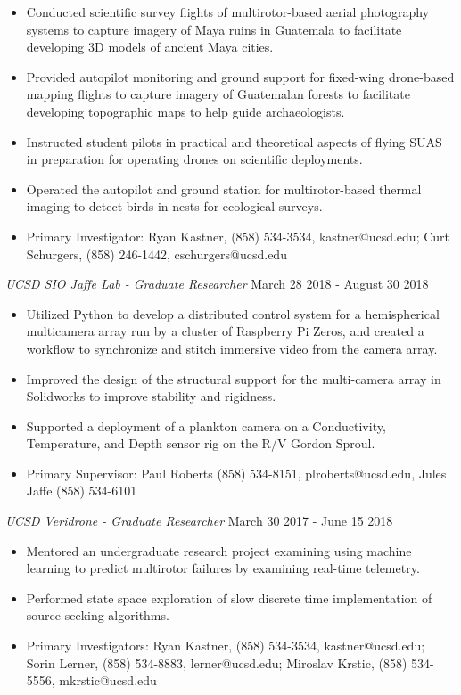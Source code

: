 \documentclass[line,margin]{res}
\begin{document}
\begin{resume}
\begin{itemize}
		\item Conducted scientific survey flights of multirotor-based aerial photography systems to capture imagery of Maya ruins in Guatemala to facilitate developing 3D models of ancient Maya cities.
		\item Provided autopilot monitoring and ground support for fixed-wing drone-based mapping flights to capture imagery of Guatemalan forests to facilitate developing topographic maps to help guide archaeologists.
		\item Instructed student pilots in practical and theoretical aspects of flying SUAS in preparation for operating drones on scientific deployments.
		\item Operated the autopilot and ground station for multirotor-based thermal imaging to detect birds in nests for ecological surveys.
		\item Primary Investigator: Ryan Kastner, (858) 534-3534, kastner@ucsd.edu; Curt Schurgers, (858) 246-1442, cschurgers@ucsd.edu
	\end{itemize}

	{\sl UCSD SIO Jaffe Lab - Graduate Researcher} \hfill March 28 2018 - August 30 2018
	\begin{itemize}
		\item Utilized Python to develop a distributed control system for a hemispherical multicamera array run by a cluster of Raspberry Pi Zeros, and created a workflow to synchronize and stitch immersive video from the camera array.
		\item Improved the design of the structural support for the multi-camera array in Solidworks to improve stability and rigidness.
		\item Supported a deployment of a plankton camera on a Conductivity, Temperature, and Depth sensor rig on the R/V Gordon Sproul.
		\item Primary Supervisor: Paul Roberts (858) 534-8151, plroberts@ucsd.edu, Jules Jaffe (858) 534-6101
	\end{itemize}

	{\sl UCSD Veridrone - Graduate Researcher} \hfill March 30 2017 - June 15 2018
	\begin{itemize}
		\item Mentored an undergraduate research project examining using machine learning to predict multirotor failures by examining real-time telemetry.
		\item Performed state space exploration of slow discrete time implementation of source seeking algorithms.
		\item Primary Investigators: Ryan Kastner, (858) 534-3534, kastner@ucsd.edu; Sorin Lerner, (858) 534-8883, lerner@ucsd.edu; Miroslav Krstic, (858) 534-5556, mkrstic@ucsd.edu
	\end{itemize}


\end{resume}
\end{document}
